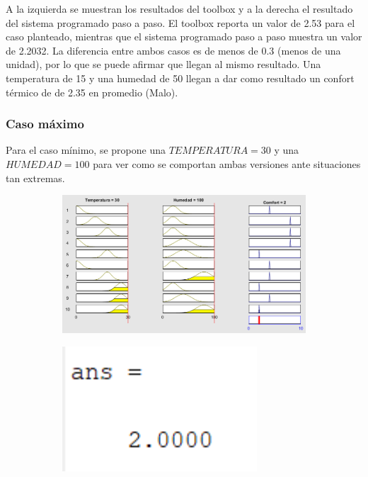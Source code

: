 \documentclass[11pt, letterpaper]{article}
\begin{document}
A la izquierda se muestran los resultados del toolbox y a la derecha el resultado del sistema programado paso a paso. El toolbox reporta un valor de 2.53 para el caso planteado, mientras que el sistema programado paso a paso muestra un valor de 2.2032. La diferencia entre ambos casos es de menos de 0.3 (menos de una unidad), por lo que se puede afirmar que llegan al mismo resultado. Una temperatura de 15 y una humedad de 50 llegan a dar como resultado un confort térmico de de 2.35 en promedio (Malo).


\newpage

\subsubsection{Caso máximo}

Para el caso mínimo, se propone una $TEMPERATURA =  30$ y una $HUMEDAD = 100$ para ver como se comportan ambas versiones ante situaciones tan extremas.

\begin{figure}[h]
	\centering
	\begin{subfigure}{0.40\textwidth} %
		\centering
		\includegraphics[width=1.4\textwidth]{IMG/RP23.png}
		\label{fig:G16}
	\end{subfigure}
	\hfill
	\begin{subfigure}{0.42\textwidth} %
		\centering
		\includegraphics[width=0.8\textwidth]{IMG/M23.png}
		\label{fig:G17}
	\end{subfigure}
	\label{fig:comparacion8}
\end{figure}
\end{document}
